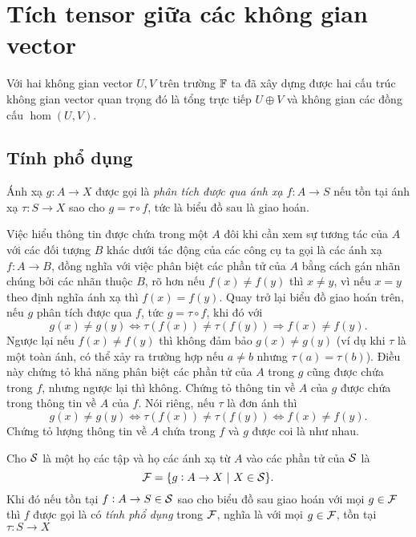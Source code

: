 \chapter{Tích tensor giữa các không gian vector}
\begin{comment*}
    Với hai không gian vector $U,V$ trên trường $\F$ ta đã xây dựng được hai cấu trúc không gian vector quan trọng đó là tổng trực tiếp $U \oplus V$ và không gian các đồng cấu $\hom(U,V)$.
\end{comment*}
\section{Tính phổ dụng}
\begin{defn}
    Ánh xạ $g: A \to X$ được gọi là \textit{phân tích được qua ánh xạ $f: A \to S$} nếu tồn tại ánh xạ $\tau: S \to X$ sao cho $g = \tau \circ f$, tức là biểu đồ sau là giao hoán.
    
\end{defn}
\begin{comment*}
    Việc hiểu thông tin được chứa trong một $A$ đôi khi cần xem sự tương tác của $A$ với các đối tượng $B$ khác dưới tác động của các công cụ ta gọi là các ánh xạ $f: A \to B$, đồng nghĩa với việc phân biệt các phần tử của $A$ bằng cách gán nhãn chúng bởi các nhãn thuộc $B$, rõ hơn nếu $f(x) \neq f(y)$ thì $x \neq y$, vì nếu $x=y$ theo định nghĩa ánh xạ thì $f(x) = f(y)$. Quay trở lại biểu đồ giao hoán trên, nếu $g$ phân tích được qua $f$, tức $g = \tau \circ f$, khi đó với 
    \[g(x) \neq g(y) \Leftrightarrow \tau(f(x)) \neq \tau(f(y)) \Rightarrow f(x) \neq f(y).\]
    Ngược lại nếu $f(x) \neq f(y)$ thì không đảm bảo $g(x) \neq g(y)$ (ví dụ khi $\tau$ là một toàn ánh, có thể xảy ra trường hợp nếu $a\neq b$ nhưng $\tau(a) = \tau(b)$). Điều này chứng tỏ khả năng phân biệt các phần tử của $A$ trong $g$ cũng được chứa trong $f$, nhưng ngược lại thì không. Chứng tỏ thông tin về $A$ của $g$ được chứa trong thông tin về $A$ của $f$. Nói riêng, nếu $\tau$ là đơn ánh thì 
    \[g(x) \neq g(y) \Leftrightarrow \tau(f(x)) \neq \tau(f(y)) \Leftrightarrow f(x) \neq f(y).\]
    Chứng tỏ lượng thông tin về $A$ chứa trong $f$ và $g$ được coi là như nhau.
\end{comment*}
\begin{defn}
    Cho $\mathcal{S}$ là một họ các tập và họ các ánh xạ từ $A$ vào các phần tử của $\mathcal{S}$ là 
        \[\mathcal{F} = \{g: A \to X~|~X \in \mathcal{S}\}.\]
    Khi đó nếu tồn tại $f: A \to S \in \mathcal{S}$ sao cho biểu đồ sau giao hoán với mọi $g \in \mathcal{F}$ thì $f$ được gọi là có \textit{tính phổ dụng} trong $\mathcal{F}$, nghĩa là với mọi $g \in \mathcal{F}$, tồn tại $\tau: S \to X$
    
\end{defn}




